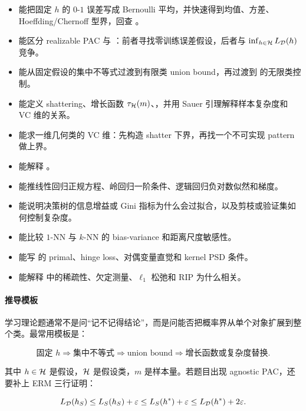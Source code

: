 \begin{itemize}
  \item 能把固定 \(h\) 的 \(0\)-\(1\) 误差写成 Bernoulli 平均，并快速得到均值、方差、Hoeffding/Chernoff 型界，回查 。
  \item 能区分 realizable PAC 与 ：前者寻找零训练误差假设，后者与 \(\inf_{h\in\mathcal{H}}L_{\mathcal{D}}(h)\) 竞争。
  \item 能从固定假设的集中不等式过渡到有限类 union bound，再过渡到  的无限类控制。
  \item 能定义 shattering、增长函数 \(\tau_{\mathcal{H}}(m)\)、，并用 Sauer 引理解释样本复杂度和 VC 维的关系。
  \item 能求一维几何类的 VC 维：先构造 shatter 下界，再找一个不可实现 pattern 做上界。
  \item 能解释 。
  \item 能推线性回归正规方程、岭回归一阶条件、逻辑回归负对数似然和梯度。
  \item 能说明决策树的信息增益或 Gini 指标为什么会过拟合，以及剪枝或验证集如何控制复杂度。
  \item 能比较 \(1\)-NN 与 \(k\)-NN 的 bias-variance 和距离尺度敏感性。
  \item 能写  的 primal、hinge loss、对偶变量直觉和 kernel PSD 条件。
  \item 能解释  中的稀疏性、欠定测量、\(\ell_1\) 松弛和 RIP 为什么相关。
\end{itemize}

\paragraph{推导模板}

学习理论题通常不是问“记不记得结论”，而是问能否把概率界从单个对象扩展到整个类。最常用模板是：

\[
  \text{固定 } h
  \Longrightarrow
  \text{集中不等式}
  \Longrightarrow
  \text{union bound}
  \Longrightarrow
  \text{增长函数或复杂度替换}.
\]

其中 \(h\in\mathcal{H}\) 是假设，\(\mathcal{H}\) 是假设类，\(m\) 是样本量。若题目出现 agnostic PAC，还要补上 ERM 三行证明：

\[
  L_{\mathcal{D}}(h_S)
  \le
  L_S(h_S)+\varepsilon
  \le
  L_S(h^*)+\varepsilon
  \le
  L_{\mathcal{D}}(h^*)+2\varepsilon.
\]

